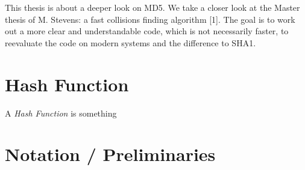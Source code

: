 This thesis is about a deeper look on MD5.
We take a closer look at the Master thesis of M. Stevens: a fast collisions finding algorithm [1].
The goal is to work out a more clear and understandable code, which is not necessarily faster, to reevaluate the code on modern systems and the difference to SHA1. 

\section{Hash Function}
A \textit{Hash Function} is something
\section{Notation / Preliminaries}
